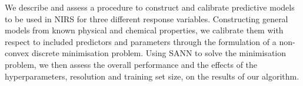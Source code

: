 We describe and assess a procedure to construct and calibrate predictive models to be used in NIRS for three different response variables.
Constructing general models from known physical and chemical properties, we calibrate them with respect to included predictors and parameters through the formulation of a non-convex discrete minimisation problem.
Using SANN to solve the minimisation problem, we then assess the overall performance and the effects of the hyperparameters, resolution and training set size, on the results of our algorithm.